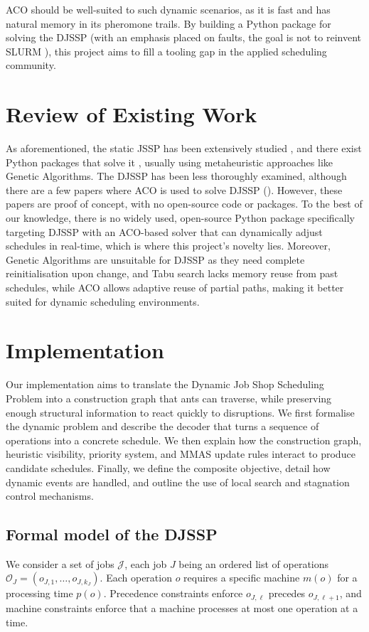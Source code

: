 \documentclass[final-report]{report-template}
\begin{document}
ACO should be well-suited to such dynamic scenarios, as it is fast and has natural memory in its pheromone trails. By building a Python package for solving the DJSSP (with an emphasis placed on faults, the goal is not to reinvent SLURM \cite{slurm}), this project aims to fill a tooling gap in the applied scheduling community.

\section{Review of Existing Work}
As aforementioned, the static JSSP has been extensively studied \cite{jssp}\cite{jssp-healthcare}\cite{jssp-manufacturing}, and there exist Python packages that solve it \cite{jobshoplib}, usually using metaheuristic approaches like Genetic Algorithms. The DJSSP has been less thoroughly examined, although there are a few papers where ACO is used to solve DJSSP (\cite{ELCOCK2023100280}\cite{acodjssp}). However, these papers are proof of concept, with no open-source code or packages.
To the best of our knowledge, there is no widely used, open-source Python package specifically targeting DJSSP with an ACO-based solver that can dynamically adjust schedules in real-time, which is where this project's novelty lies. Moreover, Genetic Algorithms are unsuitable for DJSSP as they need complete reinitialisation upon change, and Tabu search lacks memory reuse from past schedules, while ACO allows adaptive reuse of partial paths, making it better suited for dynamic scheduling environments.

\section{Implementation}
Our implementation aims to translate the Dynamic Job Shop Scheduling Problem into a construction graph that ants can traverse, while preserving enough structural information to react quickly to disruptions. We first formalise the dynamic problem and describe the decoder that turns a sequence of operations into a concrete schedule. We then explain how the construction graph, heuristic visibility, priority system, and MMAS update rules interact to produce candidate schedules. Finally, we define the composite objective, detail how dynamic events are handled, and outline the use of local search and stagnation control mechanisms.

\subsection{Formal model of the DJSSP}
We consider a set of jobs $\mathcal{J}$, each job $J$ being an ordered list of operations $\mathcal{O}_J = (o_{J,1},\dots,o_{J,k_J})$. Each operation $o$ requires a specific machine $m(o)$ for a processing time $p(o)$. Precedence constraints enforce $o_{J,\ell}$ precedes $o_{J,\ell+1}$, and machine constraints enforce that a machine processes
at most one operation at a time.
\end{document}
